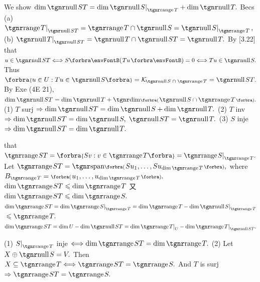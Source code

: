 We show $\dim \null ST=\dim \null S\mmid_{\range T} + \dim \null T.$\parSol{}
Becs (a) \uline{$\range T\mmid_{\null ST}=\range T\cap\null S=\null S\mmid_{\range T}\,,$}\parSol{}
 (b) \uline{$\null T\mmid_{\null ST}=\null T\cap\null ST=\null T.$} By [3.22]\PfEnd\parSol{\vspace{6pt}}
\Or \NOTICE that \uline{$u\in\null ST\Longleftrightarrow S\Par{Tu}=0\Longleftrightarrow Tu\in\null S.$}\parSol{}
\Blind{\Or}Thus \uline{$\Bra{u\in U:Tu\in\null S}=\mathcal{K}_{\!\null S\;\cap\;\range T}=\null ST.$}\parSol{}
\Blind{\Or}By Exe (4E 21), $\dim\null ST=\dim\null T+\Dim\BigPar{\null S\cap\range T}.$\PfEnd\vspace{4pt}
\ACoro (1) $T$ surj $\Rightarrow\dim\null ST=\dim\null S+\dim\null T.$\parCor
(2) $T$ inv $\Rightarrow\dim\null ST=\dim\null S,\;\null ST=\null T.$\parCor
(3) $S$ inje $\Rightarrow\dim\null ST=\dim\null T.$\vspace{-3pt}
\SepLine\pagebreak

\NOTICE that \uline{$\range ST=\Bra{Sv:v\in\range T}=\range S\mmid_{\range T}.$}\parSol{}
Let $\range ST=\Span[\BigPar]{Su_1,\dots,Su_{\dim\range T}},$ where $B_{\range T}=\BigPar{u_1,\dots,u_{\dim\range T}}.$\parSol{}
$\dim\range ST\leqslant \dim\range T$
又 $\dim\range ST\leqslant \dim\range S.$\PfEnd\parSol{\vspace{4pt}}
\Or \uline{$\dim\range ST=\dim\range S\mmid_{\range T}=\dim\range T-\dim\null S\mmid_{\range T}$}${}\leqslant \range T.$\PfEnd\parSol{}
\AComm $\dim\range ST=\dim U-\dim\null ST=\dim \range T\mmid_{U}-\dim\range T\mmid_{\null ST}.$\par\vspace{4pt}
\ACoro (1) $S\mmid_{\range T}$ inje $\Longleftrightarrow\dim\range ST=\dim\range T.$\parCor
(2) Let $X\oplus\null S=V.$ Then $X\subseteq\range T\Longleftrightarrow\range ST=\range S.$\vspace{-2pt}\parCor
{} And $T$ is surj $\Rightarrow\range ST=\range S.$
\SepLine


